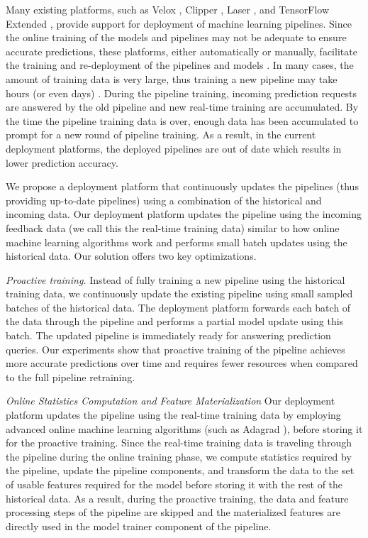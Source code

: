 Many existing platforms, such as Velox \cite{crankshaw2014missing}, Clipper \cite{crankshaw2016clipper}, Laser \cite{agarwal2014laser}, and TensorFlow Extended \cite{baylor2017tfx}, provide support for deployment of machine learning pipelines. 
Since the online training of the models and pipelines may not be adequate to ensure accurate predictions, these platforms, either automatically or manually, facilitate the training and re-deployment of the pipelines and models \cite{crankshaw2014missing}.
In many cases, the amount of training data is very large, thus training a new pipeline may take hours (or even days) \cite{baylor2017tfx}.
During the pipeline training, incoming prediction requests are answered by the old pipeline and new real-time training are accumulated.
By the time the pipeline training data is over, enough data has been accumulated to prompt for a new round of pipeline training.
As a result, in the current deployment platforms, the deployed pipelines are out of date which results in lower prediction accuracy.

We propose a deployment platform that continuously updates the pipelines (thus providing up-to-date pipelines) using a combination of the historical and incoming data.
Our deployment platform updates the pipeline using the incoming feedback data (we call this the real-time training data) similar to how online machine learning algorithms work and performs small batch updates using the historical data.
Our solution offers two key optimizations.

\textit{Proactive training.}
Instead of fully training a new pipeline using the historical training data, we continuously update the existing pipeline using small sampled batches of the historical data.
The deployment platform forwards each batch of the data through the pipeline and performs a partial model update using this batch.
The updated pipeline is immediately ready for answering prediction queries.
Our experiments show that proactive training of the pipeline achieves more accurate predictions over time and requires fewer resources when compared to the full pipeline retraining.

\textit{Online Statistics Computation and Feature Materialization}
Our deployment platform updates the pipeline using the real-time training data by employing advanced online machine learning algorithms (such as Adagrad \cite{duchi2011adaptive}), before storing it for the proactive training.
Since the real-time training data is traveling through the pipeline during the online training phase, we compute statistics required by the pipeline, update the pipeline components, and transform the data to the set of usable features required for the model before storing it with the rest of the historical data.
As a result, during the proactive training, the data and feature processing steps of the pipeline are skipped and the materialized features are directly used in the model trainer component of the pipeline.

